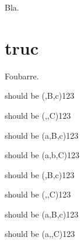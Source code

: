 \documentclass{article}
\begin{document}
\tableofcontents
Bla.
\section{truc}
Foubarre.\par\bigskip

 should be (,B,c)123 \par
{} should be (,,C)123 \par
\medskip
{}
 should be (a,B,c)123 \par
{} should be (a,b,C)123 \par
\medskip
{}
 should be (,B,c)123 \par
{} should be (,,C)123 \par
{} should be (a,B,c)123 \par
{} should be (a,,C)123 \par

\end{document}
